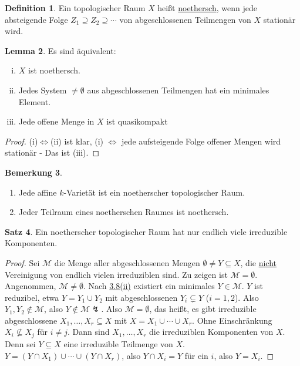 \documentclass[
twoside=semi,
fontsize=12,
DIV=12, 
cleardoublepage=current,
leqno,
headings=optiontoheadandtoc, 
toc=idx
]{scrbook}
\newcommand{\emphasize}[1]{\underline{#1}}
\theoremstyle{definition}
\newtheorem{definition}{Definition}[section]
\newtheorem{bemerkung}[definition]{Bemerkung}
\newtheorem{satz}[definition]{Satz}
\newtheorem{lemma}[definition]{Lemma}
\begin{document}
	\begin{definition}\label{1.3.7}\hfill\newline
		Ein topologischer Raum $X$ hei\ss t \emphasize{noethersch}, wenn jede absteigende Folge $Z_1 \supseteq Z_2 \supseteq \cdots $ von abgeschlossenen Teilmengen von $X$ station\"ar wird.
	\end{definition}

	\begin{lemma}\label{1.3.8}\hfill\newline
		Es sind \"aquivalent:
		\begin{enumerate}[(i)]
			\item $X$ ist noethersch.
			
			\item Jedes System $\neq \emptyset$ aus abgeschlossenen Teilmengen hat ein minimales Element.
			
			\item Jede offene Menge in $X$ ist quasikompakt
		\end{enumerate}
	\end{lemma}

	\begin{proof}
		(i)$\iff$(ii) ist klar, (i) $\iff$ jede aufsteigende Folge offener Mengen wird station\"ar - Das ist (iii).
	\end{proof}

	\begin{bemerkung}\label{1.3.9}\hfill
		\begin{enumerate}[1.]
			\item Jede affine $k$-Variet\"at ist ein noetherscher topologischer Raum.
			
			\item Jeder Teilraum eines noetherschen Raumes ist noethersch.
		\end{enumerate}
	\end{bemerkung}

	\begin{satz}\label{1.3.10}\hfill\newline
		Ein noetherscher topologischer Raum hat nur endlich viele irreduzible Komponenten.
	\end{satz}

	\begin{proof}
		Sei $\mathcal{M}$ die Menge aller abgeschlossenen Mengen $\emptyset \neq Y \subseteq X$, die \emphasize{nicht} Vereinigung von endlich vielen irreduziblen sind. Zu zeigen ist $\mathcal M = \emptyset$.
		Angenommen, $\mathcal{M} \neq \emptyset$. Nach \hyperref[1.3.8]{3.8(ii)} existiert ein minimales $Y \in \mathcal{M}$. $Y$ ist reduzibel, etwa $Y = Y_1 \cup Y_2$ mit abgeschlossenen $Y_i \subsetneq Y$ ($i = 1, 2$). Also $Y_1, Y_2 \notin \mathcal{M}$, also $Y \notin \mathcal{M} \lightning$. Also $\mathcal{M} = \emptyset$, das hei\ss t, es gibt irreduzible abgeschlossene $X_1, \dots, X_r \subseteq X$ mit $X = X_1 \cup \cdots \cup X_r$. Ohne Einschr\"ankung $X_i \nsubseteq X_j$ f\"ur $i \neq j$. Dann sind $X_1, \dots, X_r$ die irreduziblen Komponenten von $X$. Denn sei $Y \subseteq X$ eine irreduzible Teilmenge von $X$. $Y = (Y\cap X_1) \cup \cdots\cup (Y \cap X_r)$, also $Y \cap X_i = Y$ f\"ur ein $i$, also $Y = X_i$.
	\end{proof}
\end{document}
